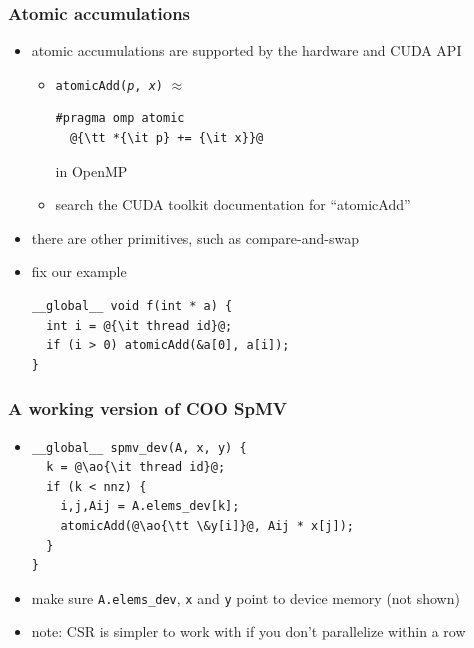 \documentclass[12pt,dvipdfmx]{beamer}
\newcommand{\ao}[1]{{\color{blue}#1}}
\begin{document}
\begin{frame}[fragile]
\frametitle{Atomic accumulations}
\begin{itemize}
\item atomic accumulations are supported by the hardware and CUDA API
  \begin{itemize}
  \item {\tt atomicAdd({\it p}, {\it x})}
    $\approx$
\begin{lstlisting}
#pragma omp atomic
  @{\tt *{\it p} += {\it x}}@
\end{lstlisting}
in OpenMP
  \item search the CUDA toolkit documentation for ``atomicAdd''
  \end{itemize}
\item there are other primitives, such as compare-and-swap
\item fix our example
\begin{lstlisting}
__global__ void f(int * a) {
  int i = @{\it thread id}@;
  if (i > 0) atomicAdd(&a[0], a[i]);
}
\end{lstlisting}
\end{itemize}
\end{frame}

\begin{frame}[fragile]
\frametitle{A working version of COO SpMV}
\begin{itemize}
\item []
\begin{lstlisting}
__global__ spmv_dev(A, x, y) {
  k = @\ao{\it thread id}@;
  if (k < nnz) {
    i,j,Aij = A.elems_dev[k];
    atomicAdd(@\ao{\tt \&y[i]}@, Aij * x[j]);
  }
}
\end{lstlisting}

\item make sure {\tt A.elems\_dev}, {\tt x} and {\tt y}
  point to device memory (not shown) 

\item note: CSR is simpler to work with
  if you don't parallelize within a row
\end{itemize}
\end{frame}
\end{document}
